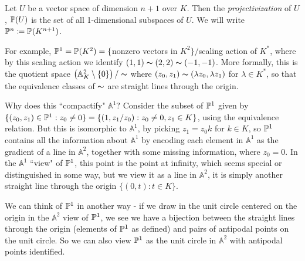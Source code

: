 \documentclass[10pt,a4paper,rgb]{article}
\begin{document}
Let $U$ be a vector space of dimension $n+1$ over $K$. Then the \emph{projectivization} of $U$, $\P(U)$ is the set of all 1-dimensional subspaces of $U$. We will write $\P^n \coloneqq \P(K^{n+1})$.

For example, $\P^1 = \P(K^2) = \{$nonzero vectors in $K^2\}/$scaling action of $K^{\ast}$, where by this scaling action we identify $(1,1) \thicksim (2,2) \thicksim (-1,-1)$. More formally, this is the quotient space $\left(\mathbb{A}_K^2\setminus\{0\}\right)/ \thicksim$ where $(z_0,z_1) \thicksim (\lambda z_0, \lambda z_1)$ for $\lambda \in K^{\ast}$, so that the equivalence classes of $\thicksim$ are straight lines through the origin.

Why does this ``compactify" $\mathbb{A}^1$? Consider the subset of $\P^1$ given by $\{(z_0, z_1) \in \P^1 : z_0 \neq 0\} = \{(1, z_1/z_0) : z_0 \neq 0, z_1 \in K\}$, using the equivalence relation. But this is isomorphic to $\mathbb{A}^1$, by picking $z_1 = z_0 k$ for $k \in K$, so $\P^1$ contains all the information about $\mathbb{A}^1$ by encoding each element in $\mathbb{A}^1$ as the gradient of a line in $\mathbb{A}^2$, together with some missing information, where $z_0 = 0$. In the $\mathbb{A}^1$ ``view" of $\P^1$, this point is the point at infinity, which seems special or distinguished in some way, but we view it as a line in $\mathbb{A}^2$, it is simply another straight line through the origin $\{(0,t) : t \in K\}$.

We can think of $\P^1$ in another way - if we draw in the unit circle centered on the origin in the $\mathbb{A}^2$ view of $\P^1$, we see we have a bijection between the straight lines through the origin (elements of $\P^1$ as defined) and pairs of antipodal points on the unit circle. So we can also view $\P^1$ as the unit circle in $\mathbb{A}^2$ with antipodal points identified.
\end{document}
